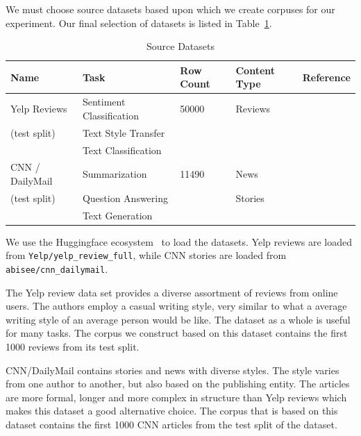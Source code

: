 \documentclass[runningheads,a4paper,11pt]{article}
\begin{document}
We must choose source datasets based upon which we create corpuses for our
experiment.
Our final selection of datasets is listed in Table~\ref{table-ds}.

\begin{table}[ht]
    \setlength\tabcolsep{6pt}
    \centering
    \begin{tabular}{@{}lllll@{}}
        \toprule
        Name            & Task                     & Row Count & Content Type & Reference              \\ \toprule
        Yelp Reviews    & Sentiment Classification & 50000     & Reviews      & \cite{yelp2015neurips} \\
        (test split)    & Text Style Transfer      &           &              &                        \\
                        & Text Classification      &           &              &                        \\ \midrule
        CNN / DailyMail & Summarization            & 11490     & News         & \cite{cnndm2015}       \\
        (test split)    & Question Answering       &           & Stories      & \cite{cnndm2017}       \\
                        & Text Generation          &           &              &                        \\ \midrule
    \end{tabular}
    \caption{Source Datasets}\label{table-ds}
\end{table}

We use the Huggingface ecosystem~\cite{lhoest-etal-2021-datasets} to load the
datasets.
Yelp reviews are loaded from \texttt{Yelp/yelp\_review\_full}, while CNN stories
are loaded from \texttt{abisee/cnn\_dailymail}.

The Yelp review data set provides a diverse assortment of reviews from online
users.
The authors employ a casual writing style, very similar to what a average
writing style of an average person would be like.
The dataset as a whole is useful for many tasks.
The corpus we construct based on this dataset contains the first 1000 reviews
from its test split.

CNN/DailyMail contains stories and news with diverse styles.
The style varies from one author to another, but also based on the publishing
entity.
The articles are more formal, longer and more complex in structure than Yelp
reviews which makes this dataset a good alternative choice.
The corpus that is based on this dataset contains the first 1000 CNN articles
from the test split of the dataset.
\end{document}
